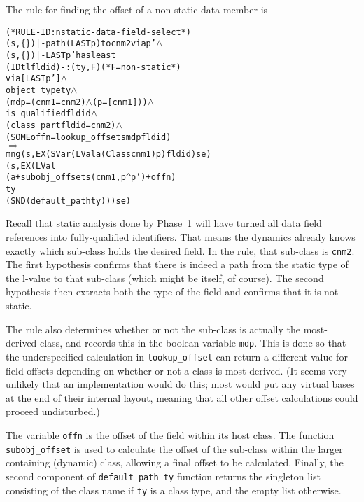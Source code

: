 \documentclass[11pt]{article}
\newcommand{\lbr}{\texttt{\{}}
\newcommand{\rbr}{\texttt{\}}}
\begin{document}
The rule for finding the offset of a non-static data member is
\begin{center}
\begin{minipage}{\textwidth}
%
\begin{alltt}
(* RULE-ID: nstatic-data-field-select *)
     (s,\lbr\rbr) |- path (LAST p) to cnm2 via p' \(\land\)
     (s,\lbr\rbr) |- LAST p' has least
                 (IDtl fldid) -: (ty, F)  (* F = non-static *)
                 via [LAST p'] \(\land\)
     object_type ty \(\land\)
     (mdp = (cnm1 = cnm2) \(\land\) (p = [cnm1])) \(\land\)
     is_qualified fldid \(\land\)
     (class_part fldid = cnm2) \(\land\)
     (SOME offn = lookup_offset s mdp fldid)
   \(\Rightarrow\)
     mng (s, EX (SVar (LVal a (Class cnm1) p) fldid) se)
         (s, EX (LVal
                  (a + subobj_offset s (cnm1, p ^ p') + offn)
                  ty
                  (SND (default_path ty))) se)
\end{alltt}
\end{minipage}
\end{center}
Recall that static analysis done by Phase~1 will have turned all data
field references into fully-qualified identifiers.  That means the
dynamics already knows exactly which sub-class holds the desired
field.  In the rule, that sub-class is \texttt{cnm2}.  The first
hypothesis confirms that there is indeed a path from the static type
of the l-value to that sub-class (which might be itself, of course).
The second hypothesis then extracts both the type of the field and
confirms that it is not static.

The rule also determines whether or not the sub-class is actually the
most-derived class, and records this in the boolean variable
\texttt{mdp}.  This is done so that the underspecified calculation in
\texttt{lookup_offset} can return a different value for field offsets
depending on whether or not a class is most-derived.  (It seems very
unlikely that an implementation would do this; most would put any
virtual bases at the end of their internal layout, meaning that all
other offset calculations could proceed undisturbed.)

The variable \texttt{offn} is the offset of the field within its host
class.  The function \texttt{subobj_offset} is used to calculate the
offset of the sub-class within the larger containing (dynamic) class,
allowing a final offset to be calculated.  Finally, the second
component of \texttt{default_path~ty} function returns the singleton
list consisting of the class name if \texttt{ty} is a class type, and
the empty list otherwise.
\end{document}
